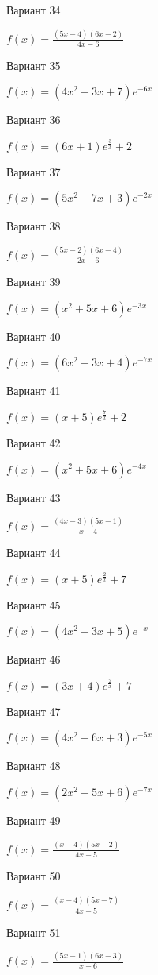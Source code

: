 \documentclass[11pt]{report}
\begin{document}
Вариант 34

$f(x) = \frac{\left(5 x - 4\right) \left(6 x - 2\right)}{4 x - 6}$

Вариант 35

$f(x) = \left(4 x^{2} + 3 x + 7\right) e^{- 6 x}$

Вариант 36

$f(x) = \left(6 x + 1\right) e^{\frac{3}{x}} + 2$

Вариант 37

$f(x) = \left(5 x^{2} + 7 x + 3\right) e^{- 2 x}$

Вариант 38

$f(x) = \frac{\left(5 x - 2\right) \left(6 x - 4\right)}{2 x - 6}$

Вариант 39

$f(x) = \left(x^{2} + 5 x + 6\right) e^{- 3 x}$

Вариант 40

$f(x) = \left(6 x^{2} + 3 x + 4\right) e^{- 7 x}$

Вариант 41

$f(x) = \left(x + 5\right) e^{\frac{7}{x}} + 2$

Вариант 42

$f(x) = \left(x^{2} + 5 x + 6\right) e^{- 4 x}$

Вариант 43

$f(x) = \frac{\left(4 x - 3\right) \left(5 x - 1\right)}{x - 4}$

Вариант 44

$f(x) = \left(x + 5\right) e^{\frac{2}{x}} + 7$

Вариант 45

$f(x) = \left(4 x^{2} + 3 x + 5\right) e^{- x}$

Вариант 46

$f(x) = \left(3 x + 4\right) e^{\frac{2}{x}} + 7$

Вариант 47

$f(x) = \left(4 x^{2} + 6 x + 3\right) e^{- 5 x}$

Вариант 48

$f(x) = \left(2 x^{2} + 5 x + 6\right) e^{- 7 x}$

Вариант 49

$f(x) = \frac{\left(x - 4\right) \left(5 x - 2\right)}{4 x - 5}$

Вариант 50

$f(x) = \frac{\left(x - 4\right) \left(5 x - 7\right)}{4 x - 5}$

Вариант 51

$f(x) = \frac{\left(5 x - 1\right) \left(6 x - 3\right)}{x - 6}$
\end{document}
